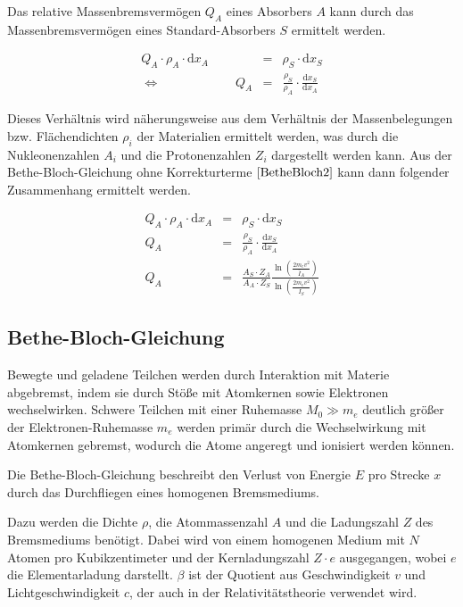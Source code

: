 \documentclass[12pt,a4paper]{scrartcl}
\numberwithin{equation}{section} %
\renewcommand{\[}{} %
\renewcommand{\]}{\noindent} %
\begin{document}
Das relative Massenbremsvermögen \(Q_A\) eines Absorbers \(A\) kann
durch das Massenbremsvermögen eines Standard-Absorbers \(S\) ermittelt
werden.

\[
\begin{eqnarray}
	Q_A \cdot \rho_A \cdot \mathrm dx_A
	&=& \rho_S \cdot \mathrm dx_S \\
	\Leftrightarrow \qquad\qquad\qquad Q_A
	&=& \frac{\rho_S}{\rho_A}
	\cdot \frac{\mathrm dx_S}{\mathrm dx_A}
\end{eqnarray}
\]

Dieses Verhältnis wird näherungsweise aus dem Verhältnis der
Massenbelegungen bzw. Flächendichten \(\rho_i\) der Materialien
ermittelt werden, was durch die Nukleonenzahlen \(A_i\) und die
Protonenzahlen \(Z_i\) dargestellt werden kann. Aus der
Bethe-Bloch-Gleichung ohne Korrekturterme \(\eqref{BetheBloch2}\) kann
dann folgender Zusammenhang ermittelt werden.

\[
\begin{eqnarray}
	Q_A \cdot \rho_A \cdot \mathrm dx_A
	&=& \rho_S \cdot \mathrm dx_S \\
	Q_A &=& \frac{\rho_S}{\rho_A} \cdot \frac{\mathrm dx_S}{\mathrm dx_A} \\
	Q_A &=& \frac{A_S\cdot Z_A}{A_A\cdot Z_S}
	\frac{\ln\left(\frac{2m_ev^2}{\bar I_A}\right)}{\ln\left(\frac{2m_ev^2}{\bar I_S}\right)}
\end{eqnarray}
\]

\hypertarget{bethe-bloch-gleichung}{%
\subsection{Bethe-Bloch-Gleichung}\label{bethe-bloch-gleichung}}

Bewegte und geladene Teilchen werden durch Interaktion mit Materie
abgebremst, indem sie durch Stöße mit Atomkernen sowie Elektronen
wechselwirken. Schwere Teilchen mit einer Ruhemasse \(M_0\gg m_e\)
deutlich größer der Elektronen-Ruhemasse \(m_e\) werden primär durch die
Wechselwirkung mit Atomkernen gebremst, wodurch die Atome angeregt und
ionisiert werden können.

Die Bethe-Bloch-Gleichung beschreibt den Verlust von Energie \(E\) pro
Strecke \(x\) durch das Durchfliegen eines homogenen Bremsmediums.

Dazu werden die Dichte \(\rho\), die Atommassenzahl \(A\) und die
Ladungszahl \(Z\) des Bremsmediums benötigt. Dabei wird von einem
homogenen Medium mit \(N\) Atomen pro Kubikzentimeter und der
Kernladungszahl \(Z\cdot e\) ausgegangen, wobei \(e\) die
Elementarladung darstellt. \(\beta\) ist der Quotient aus
Geschwindigkeit \(v\) und Lichtgeschwindigkeit \(c\), der auch in der
Relativitätstheorie verwendet wird.
\end{document}
